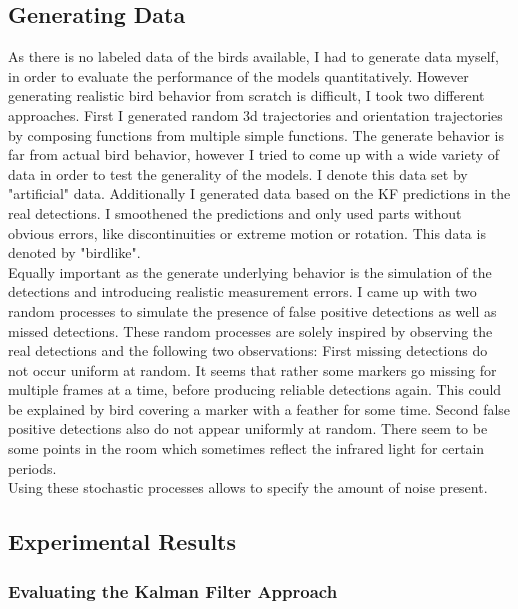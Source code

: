 \documentclass[12pt,a4paper]{article}
\begin{document}
\subsection{Generating Data}
As there is no labeled data of the birds available, I had to generate data myself, in order to evaluate the performance of the models quantitatively. However generating realistic bird behavior from scratch is difficult, I took two different approaches. First I generated random 3d trajectories and orientation trajectories by composing functions from multiple simple functions. The generate behavior is far from actual bird behavior, however I tried to come up with a wide variety of data in order to test the generality of the models. I denote this data set by "artificial" data. Additionally I generated data based on the KF predictions in the real detections. I smoothened the predictions and only used parts without obvious errors, like discontinuities or extreme motion or rotation. This data is denoted by "birdlike".\\
Equally important as the generate underlying behavior is the simulation of the detections and introducing realistic measurement errors. I came up with two random processes to simulate the presence of false positive detections as well as missed detections. These random processes are solely inspired by observing the real detections and the following two observations: First missing detections do not occur uniform at random. It seems that rather some markers go missing for multiple frames at a time, before producing reliable detections again. This could be explained by bird covering a marker with a feather for some time. Second false positive detections also do not appear uniformly at random. There seem to be some points in the room which sometimes reflect the infrared light for certain periods.\\
Using these stochastic processes allows to specify the amount of noise present.

\subsection{Experimental Results}
\subsubsection{Evaluating the Kalman Filter Approach}
\label{results_kalman_filter}
\end{document}
